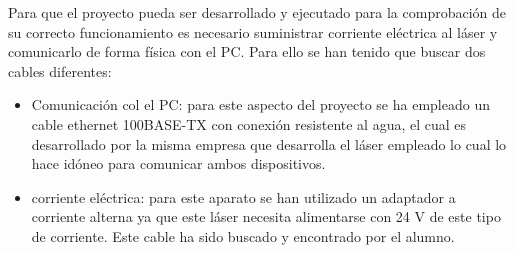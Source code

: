 Para que el proyecto pueda ser desarrollado y ejecutado para la comprobación de su correcto funcionamiento es necesario suministrar corriente eléctrica al láser y comunicarlo de forma física con el PC. Para ello se han tenido que buscar dos cables diferentes:
\begin{itemize}
	\item Comunicación col el PC: para este aspecto del proyecto se ha empleado un cable ethernet 100BASE-TX con conexión resistente al agua, el cual es desarrollado por la misma empresa que desarrolla el láser empleado lo cual lo hace idóneo para comunicar ambos dispositivos.\\
	\item corriente eléctrica: para este aparato se han utilizado un adaptador a corriente alterna ya que este láser necesita alimentarse con 24 V de este tipo de corriente. Este cable ha sido buscado y encontrado por el alumno.
\end{itemize}